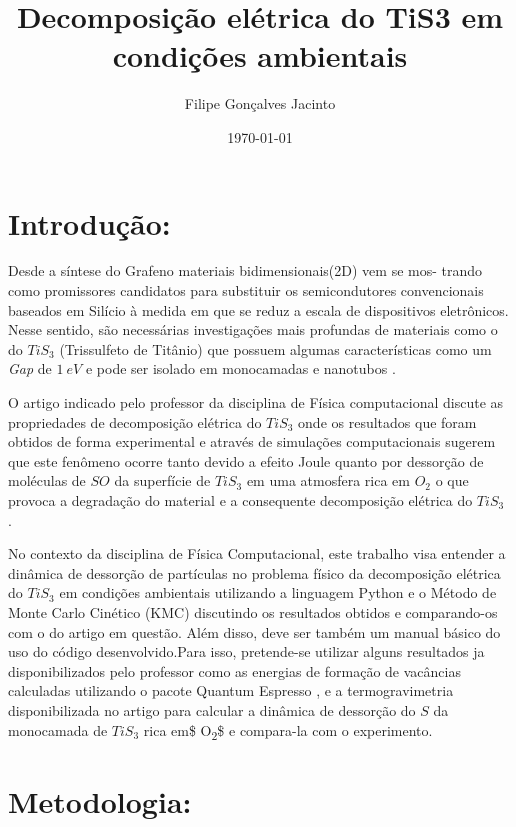 \documentclass[11pt]{article}
\author{Filipe Gonçalves Jacinto}
\date{\today}
\title{Decomposição elétrica do TiS3 em condições ambientais}
\begin{document}
\maketitle
\tableofcontents




\section{Introdução:}
\label{sec:org7721539}
Desde a síntese do Grafeno \cite{geim2010rise} materiais bidimensionais(2D) vem se mos- \linebreak trando como promissores candidatos para substituir os semicondutores convencionais baseados em Silício à medida em que se reduz a escala de dispositivos eletrônicos. Nesse sentido, são necessárias investigações mais profundas de materiais como o do \(TiS_3\) (Trissulfeto de Titânio) que possuem algumas características como um  \textit{Gap} de \(1~eV\) e pode ser isolado em monocamadas e nanotubos \cite{molina2017high}.

O artigo indicado pelo professor da disciplina de Física computacional \cite{molina2017high} discute as propriedades de decomposição elétrica do \(TiS_3\) onde os resultados que foram obtidos de forma experimental e através de simulações computacionais sugerem que este fenômeno ocorre tanto devido a efeito Joule quanto por dessorção de moléculas de \(SO\) da superfície de \(TiS_3\) em uma atmosfera rica em \(O_2\) o que provoca a degradação do material e a consequente decomposição elétrica do \(TiS_3\) .

No contexto da disciplina de Física Computacional, este trabalho visa entender a dinâmica de dessorção de partículas no problema físico da decomposição elétrica do \(TiS_3\) em condições ambientais utilizando a linguagem Python e o Método de Monte Carlo Cinético (KMC) discutindo os resultados obtidos e comparando-os com o do artigo em questão\cite{molina2017high}. Além disso, deve ser também um manual básico do uso do código desenvolvido.Para isso, pretende-se utilizar alguns resultados ja disponibilizados pelo professor como as energias de formação de vacâncias calculadas utilizando o pacote Quantum Espresso\cite{giannozzi2009quantum} , e a termogravimetria disponibilizada no artigo\cite{molina2017high} para calcular a dinâmica de dessorção do \(S\) da monocamada de \(TiS_3\) rica em\$ O\textsubscript{2}\$ e compara-la com o experimento.


\section{Metodologia:}
\label{sec:orgd85121b}
\end{document}
